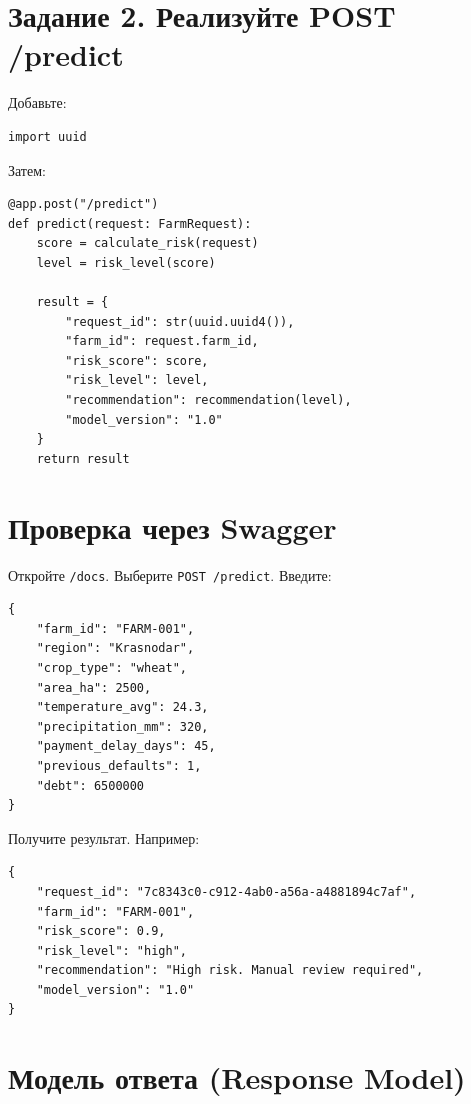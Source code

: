 \documentclass[12pt,a4paper]{article}
\begin{document}
\section{Задание 2. Реализуйте POST /predict}

Добавьте:

\begin{lstlisting}[caption={Импорт uuid}]
import uuid
\end{lstlisting}

Затем:

\begin{lstlisting}[caption={Endpoint /predict}]
@app.post("/predict")
def predict(request: FarmRequest):
    score = calculate_risk(request)
    level = risk_level(score)

    result = {
        "request_id": str(uuid.uuid4()),
        "farm_id": request.farm_id,
        "risk_score": score,
        "risk_level": level,
        "recommendation": recommendation(level),
        "model_version": "1.0"
    }
    return result
\end{lstlisting}

\section{Проверка через Swagger}

Откройте \texttt{/docs}. Выберите \texttt{POST /predict}. Введите:

\begin{lstlisting}[caption={Тестовый запрос}]
{
    "farm_id": "FARM-001",
    "region": "Krasnodar",
    "crop_type": "wheat",
    "area_ha": 2500,
    "temperature_avg": 24.3,
    "precipitation_mm": 320,
    "payment_delay_days": 45,
    "previous_defaults": 1,
    "debt": 6500000
}
\end{lstlisting}

Получите результат. Например:

\begin{lstlisting}[caption={Пример ответа}]
{
    "request_id": "7c8343c0-c912-4ab0-a56a-a4881894c7af",
    "farm_id": "FARM-001",
    "risk_score": 0.9,
    "risk_level": "high",
    "recommendation": "High risk. Manual review required",
    "model_version": "1.0"
}
\end{lstlisting}

\section{Модель ответа (Response Model)}
\end{document}
